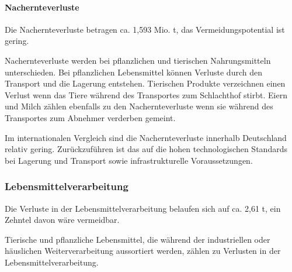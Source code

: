  

\paragraph{Nachernteverluste}
Die Nachernteverluste betragen ca. 1,593 Mio. t, das Vermeidungspotential ist gering. %

Nachernteverluste werden bei pflanzlichen und tierischen Nahrungsmitteln unterschieden. Bei pflanzlichen Lebensmittel können Verluste durch den Transport und die Lagerung entstehen.  Tierischen Produkte verzeichnen einen Verlust wenn das Tiere während des Transportes zum Schlachthof stirbt. Eiern und Milch zählen ebenfalls zu den Nachernteverluste wenn sie während des Transportes zum Abnehmer verderben gemeint. %
 
Im internationalen Vergleich sind die Nachernteverluste innerhalb Deutschland relativ gering. Zurückzuführen ist das auf die hohen technologischen Standards bei Lagerung und Transport sowie infrastrukturelle Voraussetzungen. %

\subsubsection{Lebensmittelverarbeitung}
Die Verluste in der Lebensmittelverarbeitung belaufen sich auf ca. 2,61 t, ein Zehntel davon wäre vermeidbar. %

Tierische und pflanzliche Lebensmittel, die während der industriellen
oder häuslichen Weiterverarbeitung aussortiert werden, zählen zu Verlusten in der Lebensmittelverarbeitung.%

